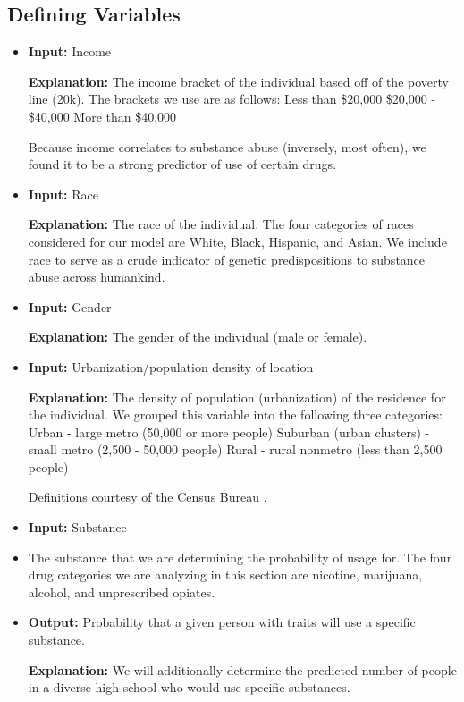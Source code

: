 \documentclass[12pt]{article}
\newcommand{\expl}{\textbf{Explanation: }}
\begin{document}
\subsection{Defining Variables}
\begin{itemize}
    \item \textbf{Input:} Income 
    
    \expl The income bracket of the individual based off of the poverty line (20k). The brackets we use are as follows: 
    \subitem Less than \$20,000 
    \subitem \$20,000 - \$40,000 
    \subitem More than \$40,000
    
    Because income correlates to substance abuse (inversely, most often), we found it to be a strong predictor of use of certain drugs.
    \item \textbf{Input:} Race
    
    \expl The race of the individual. The four categories of races considered for our model are White, Black, Hispanic, and Asian. We include race to serve as a crude indicator of genetic predispositions to substance abuse across humankind.
    
    \item \textbf{Input:} Gender 
    
    \expl The gender of the individual (male or female).
    
    \item \textbf{Input:} Urbanization/population density of location 
    
    \expl The density of population (urbanization) of the residence for the individual. We grouped this variable into the following three categories: 
    \subitem Urban - large metro (50,000 or more people)
    \subitem Suburban (urban clusters) - small metro (2,500 - 50,000 people)
    \subitem Rural - rural nonmetro  (less than 2,500 people)
    
    Definitions courtesy of the Census Bureau \cite{censusDesignation}. 
    
    \item \textbf{Input:} Substance
    
    \item The substance that we are determining the probability of usage for. The four drug categories we are analyzing in this section are nicotine, marijuana, alcohol, and unprescribed opiates.
    
    \item \textbf{Output:} Probability that a given person with traits will use a specific substance.
    
    \expl We will additionally determine the predicted number of people in a diverse high school who would use specific substances. 

\end{itemize}
\end{document}
